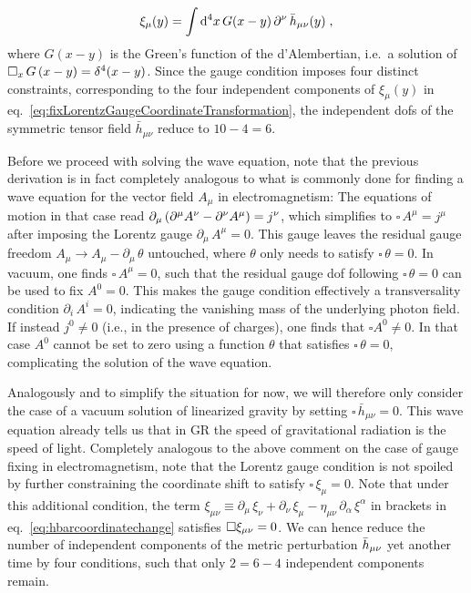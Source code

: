 \begin{align}
	\xi_\mu(y) = \int \mathop{}\!\mathrm{d^4}x\, G(x - y) \, \partial^\nu \, \bar{h}_{\mu \nu}(y) \; ,
	\label{eq:fixLorentzGaugeCoordinateTransformation}
\end{align}
where  $G(x-y)$ is the Green's function of the d'Alembertian, i.e.~a solution of $\square_x \, G\left( x - y \right) = \delta^4(x- y)$. Since the gauge condition imposes four distinct constraints, corresponding to the four independent components of $\xi_\mu(y)$ in eq.~\eqref{eq:fixLorentzGaugeCoordinateTransformation}, the independent \acp{dof} of the symmetric tensor field $\bar{h}_{\mu \nu}$ reduce to $10 - 4 = 6$.

Before we proceed with solving the wave equation, note that the previous derivation is in fact completely analogous to what is commonly done for finding a wave equation for  the vector field $A_\mu$ in electromagnetism: The equations of motion in that case read $\partial_\mu \left( \partial^\mu A^\nu - \partial^\nu A^\mu \right) = j^\nu$, which simplifies to $\square \,A^\mu = j^\mu$ after imposing the Lorentz gauge $\partial_\mu \, A^\mu = 0$. This gauge leaves the residual gauge freedom $A_\mu \rightarrow A_{\mu} - \partial_\mu \, \theta$ untouched, where $\theta$ only needs to satisfy $\square \,\theta = 0$. In vacuum, one finds $\square \,A^\mu = 0$, such that the residual gauge \ac{dof} following $\square \,\theta = 0$ can be used to fix $A^0 = 0$. This makes the gauge condition effectively a transversality condition $\partial_i \,A^i = 0$, indicating the vanishing mass of the underlying photon field. If instead $j^0 \neq 0$ (i.e., in the presence of charges), one finds that $\square A^0 \neq 0$. In that case $A^0$ cannot be set to zero using a function $\theta$ that satisfies $\square \,\theta = 0$, complicating the solution of the wave equation.

Analogously and to simplify the situation for now, we will therefore only consider the case of a vacuum solution of linearized gravity by setting $\square \, \bar{h}_{\mu \nu} = 0$. This wave equation already tells us that in \ac{GR} the speed of gravitational radiation is the speed of light. Completely analogous to the above comment  on the case of gauge fixing in electromagnetism, note that the Lorentz gauge condition is not spoiled by further constraining the coordinate shift to satisfy $\square \,\xi_\mu = 0$. Note that under this additional condition, the term $\xi_{\mu \nu} \equiv \partial_\mu \, \xi_\nu + \partial_\nu \, \xi_\mu - \eta_{\mu \nu} \, \partial_\alpha \, \xi^\alpha$ in brackets in eq.~\eqref{eq:hbarcoordinatechange} satisfies $\square \xi_{{\mu \nu}} = 0$. We can hence reduce the number of independent components of the metric perturbation $\bar{h}_{{\mu \nu}}$ yet another time by four conditions, such that only $2 = 6 - 4$ independent components remain.

